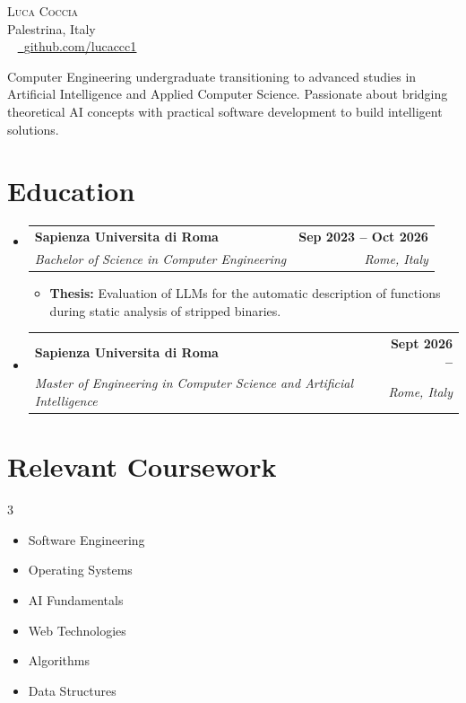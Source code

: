 \documentclass[letterpaper,11pt]{article}
\makeatletter
\newcommand{\resumeItem}[1]{
  \item\small{
    {#1 \vspace{-2pt}}
  }
}
\newcommand{\resumeSubheading}[4]{
  \vspace{-2pt}\item
    \begin{tabular*}{1.0\textwidth}[t]{l@{\extracolsep{\fill}}r}
      \textbf{#1} & \textbf{\small #2} \\
      \textit{\small#3} & \textit{\small #4} \\
    \end{tabular*}\vspace{-7pt}
}
\newcommand{\resumeSubHeadingListStart}{\begin{itemize}[leftmargin=0.0in, label={}]}
\newcommand{\resumeSubHeadingListEnd}{\end{itemize}}
\newcommand{\resumeItemListStart}{\begin{itemize}}
\newcommand{\resumeItemListEnd}{\end{itemize}\vspace{-5pt}}
\makeatother
\begin{document}
\begin{center}
    {\Huge \scshape Luca Coccia} \\ \vspace{1pt}
    Palestrina, Italy \\ \vspace{1pt}
    \small {} ~ 
    \href{https://github.com/lucaccc1}{\raisebox{-0.2\height}{\faGithub}\ \underline{github.com/lucaccc1}}
    \vspace{-8pt}
\end{center}

\vspace{5pt}
\small{Computer Engineering undergraduate transitioning to advanced studies in Artificial Intelligence and Applied Computer Science. Passionate about bridging theoretical AI concepts with practical software development to build intelligent solutions.}
\vspace{5pt}

\section{Education}
  \resumeSubHeadingListStart
    \resumeSubheading
      {Sapienza Universita di Roma}{Sep 2023 -- Oct 2026}
      {Bachelor of Science in Computer Engineering}{Rome, Italy}
      \resumeItemListStart
        \resumeItem{\textbf{Thesis:} Evaluation of LLMs for the automatic description of functions during static analysis of stripped binaries.}
      \resumeItemListEnd
    \resumeSubheading
      {Sapienza Universita di Roma}{Sept 2026 --}
      {Master of Engineering in Computer Science and Artificial Intelligence}{Rome, Italy}
  \resumeSubHeadingListEnd

\section{Relevant Coursework}
    \begin{multicols}{3}
        \begin{itemize}[itemsep=-5pt, parsep=3pt]
            \item\small Software Engineering
            \item Operating Systems
            \item AI Fundamentals
            \item Web Technologies
            \item Algorithms
            \item Data Structures
        \end{itemize}
    \end{multicols}
    \vspace*{2.0\multicolsep}
\end{document}
